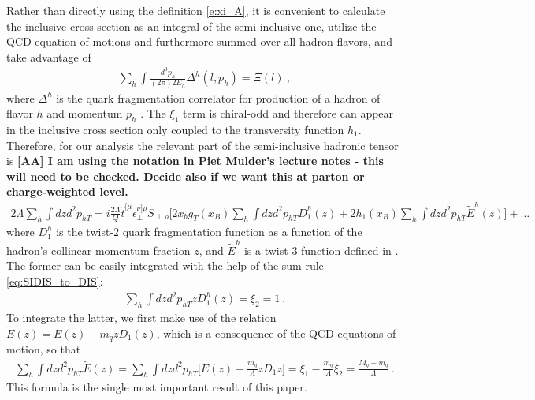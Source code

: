 \documentclass[preprintnumbers,floatfix,nofootinbib]{revtex4}
\newcommand{\todo}[1]{\marginpar{$\bullet$}\textbf{#1}}
\newcommand{\mj}{M_q}
\begin{document}
Rather than directly using the definition \eqref{e:xi_A}, it is convenient to calculate the inclusive cross section as an integral of the semi-inclusive one, utilize the QCD equation of motions and furthermore summed over all hadron flavors, and take advantage of 
\begin{align}
  \label{eq:SIDIS_to_DIS}
  \sum_h \int \frac{d^3p_h}{(2\pi)2E_h} \Delta^h(l,p_h) = \Xi(l) \ , 
\end{align}
where $\Delta^h$ is the quark fragmentation correlator for production of a hadron of flavor $h$ and momentum $p_h$ \cite{New_testament}. 
The $\xi_1$ term is chiral-odd and therefore can appear in the inclusive cross section only coupled to the transversity function $h_1$. Therefore, for our analysis the relevant part of the semi-inclusive hadronic tensor is 
\todo{[AA] I am using the notation in Piet Mulder's lecture notes - this will need to be checked. Decide also if we want this at parton or charge-weighted level.}
\begin{align}
  \label{eq:Wsidis_ini}
  2 \Lambda \sum_h \int dz d^2p_{hT} = i \frac{2\Lambda}{Q} 
    \hat t^{[\mu} \epsilon_\perp^{\nu]\rho}S_{\perp\rho} 
    \Big[ 2 x_b g_T(x_B) \sum_h \int dz d^2p_{hT} D_1^h(z)
    + 2 h_1(x_B) \sum_h \int dz d^2p_{hT} \tilde E^h(z) \Big] + \ldots
\end{align}
where $D_1^h$ is the twist-2 quark fragmentation function as a function of the hadron's collinear momentum fraction $z$, and $\tilde E^h$ is a twist-3 function defined in \cite{New-testament}. The former can be easily integrated with the help of the sum rule \eqref{eq:SIDIS_to_DIS}:
\begin{align}
  \sum_h \int dz d^2p_{hT} z D_1^h(z) = \xi_2 = 1 \ .
\end{align}
To integrate the latter, we first make use of the relation \cite{New-testament}
$\tilde E(z) = E(z) - m_q z D_1(z)$, which is a consequence of the QCD equations of motion, so that 
\begin{align}
  \sum_h \int dz d^2p_{hT} \tilde E(z) 
    = \sum_h \int dz d^2p_{hT} \Big[ E(z) - \frac{m_q}{\Lambda} z D_1z \Big]
    = \xi_1 - \frac{m_q}{\Lambda} \xi_2 = \frac{\mj - m_q}{\Lambda} \ .
\end{align}
This formula is the single most important result of this paper.
\end{document}
